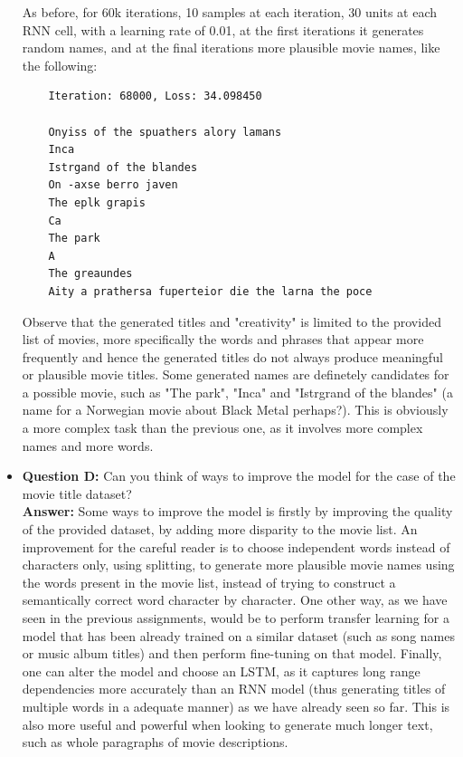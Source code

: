 \documentclass{article}
\begin{document}
\begin{itemize}
	As before, for 60k iterations, 10 samples at each iteration, 30 units at each RNN cell, with a learning rate of 0.01, at the first iterations it generates random names, and at the final iterations more plausible movie names, like the following:
	
	\begin{lstlisting}
	Iteration: 68000, Loss: 34.098450
		
	Onyiss of the spuathers alory lamans
	Inca
	Istrgand of the blandes
	On -axse berro javen
	The eplk grapis
	Ca
	The park
	A
	The greaundes
	Aity a prathersa fuperteior die the larna the poce\end{lstlisting}
    
    Observe that the generated titles and "creativity" is limited to the provided list of movies, more specifically the words and phrases that appear more frequently and hence the generated titles do not always produce meaningful or plausible movie titles. Some generated names are definetely candidates for a possible movie, such as "The park", "Inca" and "Istrgrand of the blandes" (a name for a Norwegian movie about Black Metal perhaps?). This is obviously a more complex task than the previous one, as it involves more complex names and more words.
	
	\item \textbf{Question D:} Can you think of ways to improve the model for the case of the movie title dataset? \\
	
		\textbf{Answer:} Some ways to improve the model is firstly by improving the quality of the provided dataset, by adding more disparity to the movie list. An improvement for the careful reader is to choose independent words instead of characters only, using splitting, to generate more plausible movie names using the words present in the movie list, instead of trying to construct a semantically correct word character by character. One other way, as we have seen in the previous assignments, would be to perform transfer learning for a model that has been already trained on a similar dataset (such as song names or music album titles) and then perform fine-tuning on that model. Finally, one can alter the model and choose an LSTM, as it captures long range dependencies more accurately than an RNN model (thus generating titles of multiple words in a adequate manner) as we have already seen so far. This is also more useful and powerful when looking to generate much longer text, such as whole paragraphs of movie descriptions.
	
    \end{itemize}
\end{document}
